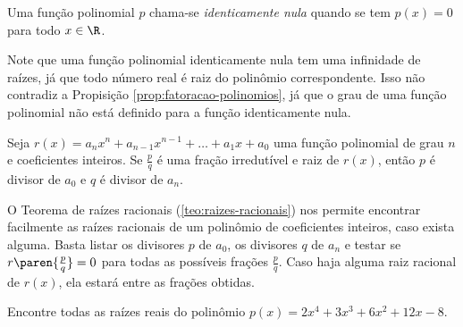 \begin{definition}
Uma função polinomial $p$ chama-se \emph{identicamente nula} quando
se tem $p(x) = 0$ para todo $x \in \R$.
\end{definition}

\begin{remark}
Note que uma função polinomial identicamente nula tem uma infinidade de raízes, 
já que todo número real é raiz do polinômio correspondente. 
Isso não contradiz a Propisição \ref{prop:fatoracao-polinomios}, 
já que o grau de uma função polinomial não está definido para a função identicamente nula.
\end{remark}

\begin{theorem} 
\label{teo:raizes-racionais}
    Seja $r(x) = a_n x^n + a_{n-1} x^{n-1} + \dots + a_1 x + a_0$ uma função polinomial de grau $n$ e coeficientes inteiros. Se $\frac p q$ é uma fração irredutível e raiz de $r (x)$, então $p$ é divisor de $a_0$ e $q$ é divisor de $a_n$.
\end{theorem}

O Teorema de raízes racionais (\ref{teo:raizes-racionais}) nos permite encontrar facilmente as raízes racionais de um polinômio de coeficientes inteiros, caso exista alguma. Basta listar os divisores $p$ de $a_0$, os divisores $q$ de $a_n$ e testar se $r \paren {\frac p q} = 0$ para todas as possíveis frações $\frac p q$. Caso haja alguma raiz racional de $r(x)$, ela estará entre as frações obtidas.

\begin{example}
    Encontre todas as raízes reais do polinômio $p(x) = 2x^4 + 3x^3 + 6x^2 + 12x -8$.
\end{example}

